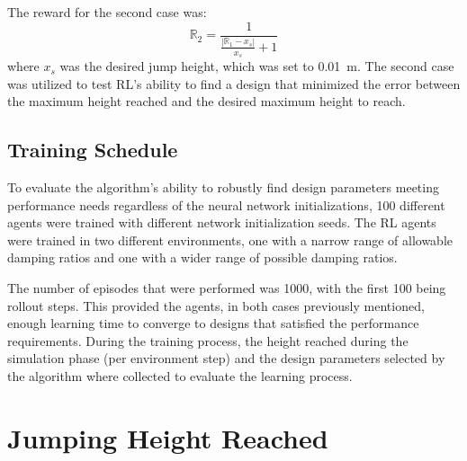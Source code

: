 \documentclass[letterpaper, 10 pt, conference]{ieeeconf}  %
\begin{document}
The reward for the second case was:
%
\begin{equation}
        \mathbb{R}_2 = \frac{1}{\frac{\left | \mathbb{R}_1 - x_s \right |}{x_s} + 1}
\end{equation}
%
where $x_s$ was the desired jump height, which was set to 0.01~m. The second case was utilized to test RL's ability to find a design that minimized the error between the maximum height reached and the desired maximum height to reach. 

\subsection{Training Schedule}

To evaluate the algorithm's ability to robustly find design parameters meeting performance needs regardless of the neural network initializations, 100 different agents were trained with different network initialization seeds. The RL agents were trained in two different environments, one with a narrow range of allowable damping ratios and one with a wider range of possible damping ratios.

The number of episodes that were performed was 1000, with the first 100 being rollout steps. This provided the agents, in both cases previously mentioned, enough learning time to converge to designs that satisfied the performance requirements. During the training process, the height reached during the simulation phase (per environment step) and the design parameters selected by the algorithm where collected to evaluate the learning process. 

\section{Jumping Height Reached} 
\label{sec:results}
\end{document}
